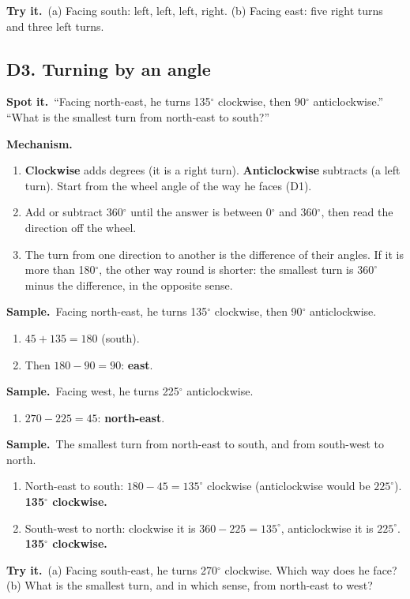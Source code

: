 \documentclass[11pt,a4paper]{article}
\let\oldsubsection\subsection
\renewcommand{\subsection}{\needspace{9\baselineskip}\oldsubsection}
\newcommand{\spot}{\textbf{\color{ember}Spot it.}\ }
\newcommand{\mech}{\textbf{\color{ember}Mechanism.}\ }
\newif\ifkeepsamp
\newcommand{\samp}{\ifkeepsamp\needspace{4\baselineskip}\fi\textbf{\color{ember}Sample.}\ }
\newcommand{\tryit}[1]{\textbf{\color{ember}Try it.}\ #1}
\begin{document}
\tryit (a) Facing south: left, left, left, right. (b) Facing east: five right turns and three left turns.

\subsection{D3. Turning by an angle}
\spot ``Facing north-east, he turns 135$^\circ$ clockwise, then 90$^\circ$ anticlockwise.'' ``What is the smallest turn from north-east to south?''

\mech
\begin{enumerate}
\item \textbf{Clockwise} adds degrees (it is a right turn). \textbf{Anticlockwise} subtracts (a left turn). Start from the wheel angle of the way he faces (D1).
\item Add or subtract 360$^\circ$ until the answer is between 0$^\circ$ and 360$^\circ$, then read the direction off the wheel.
\item The turn from one direction to another is the difference of their angles. If it is more than 180$^\circ$, the other way round is shorter: the smallest turn is $360^\circ$ minus the difference, in the opposite sense.
\end{enumerate}

\samp Facing north-east, he turns 135$^\circ$ clockwise, then 90$^\circ$ anticlockwise.
\begin{enumerate}
\item $45 + 135 = 180$ (south).
\item Then $180 - 90 = 90$: \textbf{east}.
\end{enumerate}
\samp Facing west, he turns 225$^\circ$ anticlockwise.
\begin{enumerate}
\item $270 - 225 = 45$: \textbf{north-east}.
\end{enumerate}
\samp The smallest turn from north-east to south, and from south-west to north.
\begin{enumerate}
\item North-east to south: $180 - 45 = 135^\circ$ clockwise (anticlockwise would be $225^\circ$). \textbf{135$^\circ$ clockwise.}
\item South-west to north: clockwise it is $360 - 225 = 135^\circ$, anticlockwise it is $225^\circ$. \textbf{135$^\circ$ clockwise.}
\end{enumerate}

\tryit (a) Facing south-east, he turns 270$^\circ$ clockwise. Which way does he face? (b) What is the smallest turn, and in which sense, from north-east to west?
\end{document}
